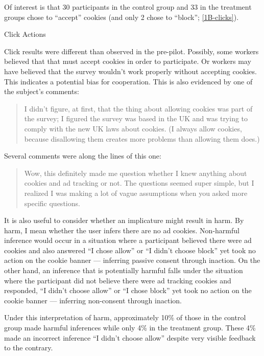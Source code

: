 Of interest is that 30 participants in the control group and 33 in the treatment groups chose to ``accept'' cookies (and only 2 chose to ``block'';  \autoref{1B-clicks}). 


\begin{table}
\caption{Click Actions}
\centering

\label{1B-clicks}
\end{table}


Click results were different than observed in the pre-pilot. Possibly, some workers believed that that must accept cookies in order to participate. Or workers may have believed that the survey wouldn't work properly without accepting cookies. This indicates a potential bias for cooperation. This is also evidenced by one of the subject's comments:

\begin{quote}
I didn't figure, at first, that the thing about allowing cookies was part of the survey; I figured the survey was based in the UK and was trying to comply with the new UK laws about cookies. (I always allow cookies, because disallowing them creates more problems than allowing them does.)
\end{quote}
Several comments were along the lines of this one:
\begin{quote}
Wow, this definitely made me question whether I knew anything about cookies and ad tracking or not. The questions seemed super simple, but I realized I was making a lot of vague assumptions when you asked more specific questions.
\end{quote}

It is also useful to consider whether an implicature might result in harm. By harm, I mean whether the user infers there are no ad cookies. Non-harmful inference would occur in a situation where a participant believed there were ad cookies and also answered ``I chose allow'' or ``I didn't choose block'' yet took no action on the cookie banner --- inferring passive consent through inaction. On the other hand, an inference that is potentially harmful falls under the situation where the participant did not believe there were ad tracking cookies and responded, ``I didn't choose allow'' or ``I chose block'' yet took no action on the cookie banner --- inferring non-consent through inaction.

Under this interpretation of harm, approximately 10\% of those in the control group made harmful inferences while only 4\% in the treatment group. These 4\% made an incorrect inference ``I didn't choose allow'' despite very visible feedback to the contrary.

